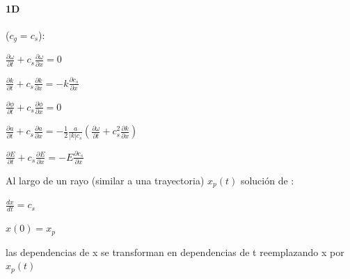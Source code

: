 \documentclass{article}
\begin{document}
\paragraph{1D} 
($c_g = c_s$):
\begin{description}  
\item$\frac{\partial \omega}{\partial t} + c_s \frac{\partial \omega}{\partial x} = 0 $
\item$\frac{\partial k}{\partial t} + c_s \frac{\partial k}{\partial x} = -k \frac{\partial c_s}{\partial x} $
\item$\frac{\partial \phi}{\partial t} + c_s \frac{\partial \phi}{\partial x} = 0 $
\item $\frac{\partial a}{\partial t} + c_s \frac{\partial a}{\partial x} = -\frac{1}{2} \frac{a}{|k| c_s} (\frac{\partial \omega}{\partial t} + c_s^{2} \frac{\partial k}{\partial x}) $

\item$\frac{\partial E}{\partial t} + c_s \frac{\partial E}{\partial x} = -E \frac{\partial  c_s}{\partial x} $


\end{description}

Al largo de un rayo (similar a una trayectoria) $x_p(t)$ solución de :

\begin{description}  
\item$\frac{dx}{dt} = c_s $
\item$ x(0) = x_p $
\end{description}
las dependencias de x se transforman en dependencias de t reemplazando x por $x_p(t) $ 
\end{document}
